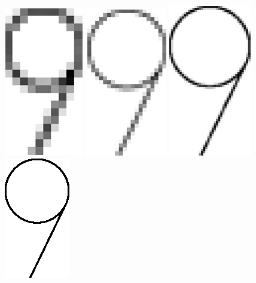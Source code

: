 \documentclass[a4paper, 10pt]{article}
\begin{document}
		\begin{figure}[h!]
			\centering
			\includegraphics[scale=0.2]{alias.png}
			\hspace*{0.4cm}
			\includegraphics[scale=0.2]{alias1.png}
			\hspace*{0.4cm}
			\includegraphics[scale=0.2]{alias2.png}
			\hspace*{0.4cm}
			\includegraphics[scale=0.25]{alias3.png}
		\end{figure}
		
\end{document}
